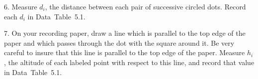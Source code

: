 \item{6.} Measure $d_i$, the distance between each pair of 
successive circled dots.  Record each $d_i$ in Data~Table~5.1.
\vfil\eject
\item{7.} On your recording paper, draw a line which is parallel 
to the top edge of the paper and which passes through the dot with 
the square around it.  Be very careful to insure that this line
is parallel to the top edge of the paper.  Measure $h_i$, the 
altitude of each labeled point with respect to this line, and
record that value in Data~Table~5.1.  
\smallskip

{}

